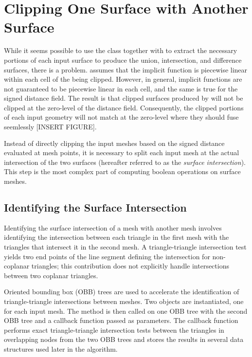 \documentclass{InsightArticle}
\begin{document}
\section{Clipping One Surface with Another Surface}

While it seems possible to use the class  together with  to extract the necessary portions of each input surface to produce the union, intersection, and difference surfaces, there is a problem.  assumes that the implicit function is piecewise linear within each cell of the  being clipped. However, in general, implicit functions are not guaranteed to be piecewise linear in each cell, and the same is true for the signed distance field. The result is that clipped surfaces produced by  will not be clipped at the zero-level of the distance field. Consequently, the clipped portions of each input geometry will not match at the zero-level where they should fuse seemlessly [INSERT FIGURE].

Instead of directly clipping the input meshes based on the signed distance evaluated at mesh points, it is necessary to split each input mesh at the actual intersection of the two surfaces (hereafter referred to as the \emph{surface intersection}). This step is the most complex part of computing boolean operations on surface meshes.

\subsection{Identifying the Surface Intersection}

Identifying the surface intersection of a mesh with another mesh involves identifying the intersection between each triangle in the first mesh with the triangles that intersect it in the second mesh. A triangle-triangle intersection test yields two end points of the line segment defining the intersection for non-coplanar triangles; this contribution does not explicitly handle intersections between two coplanar triangles. 

Oriented bounding box (OBB) trees are used to accelerate the identification of triangle-triangle intersections between meshes. Two  objects are instantiated, one for each input mesh. The method  is then called on one OBB tree with the second OBB tree and a callback function passed as parameters. The callback function performs exact triangle-triangle intersection tests between the triangles in overlapping nodes from the two OBB trees and stores the results in several data structures used later in the algorithm.
\end{document}
